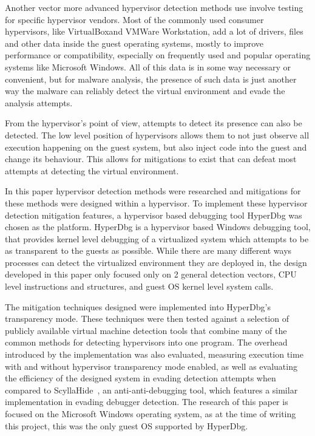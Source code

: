 Another vector more advanced hypervisor detection methods use involve testing for specific hypervisor vendors. Most of the commonly used consumer hypervisors, like VirtualBox\texttrademark and VMWare Workstation\texttrademark, 
add a lot of drivers, files and other data inside the guest operating systems, mostly to improve performance or compatibility, especially on frequently used and popular operating systems like Microsoft Windows. 
All of this data is in some way necessary or convenient, but for malware analysis, the presence of such data is just another way the malware can reliably detect the virtual environment and evade the analysis attempts.

From the hypervisor's point of view, attempts to detect its presence can also be detected. The low level position of hypervisors allows them to not just observe all execution happening on the guest system, 
but also inject code into the guest and change its behaviour. This allows for mitigations to exist that can defeat most attempts at detecting the virtual environment.

In this paper hypervisor detection methods were researched and mitigations for these methods were designed within a hypervisor. To implement these hypervisor detection mitigation features, 
a hypervisor based debugging tool HyperDbg was chosen as the platform. HyperDbg is a hypervisor based Windows debugging tool, that provides kernel level debugging of a virtualized system which attempts to be as transparent to the guests as possible.
While there are many different ways processes can detect the virtualized environment they are deployed in, the design developed in this paper only focused only on 2 general detection vectors, 
CPU level instructions and structures, and guest OS kernel level system calls.

The mitigation techniques designed were implemented into HyperDbg's transparency mode. 
These techniques were then tested against a selection of publicly available virtual machine detection tools that combine many of the common methods for detecting hypervisors into one program. 
The overhead introduced by the implementation was also evaluated, measuring execution time with and without hypervisor transparency mode enabled, as well as evaluating the efficiency of the 
designed system in evading detection attempts when compared to ScyllaHide~\cite{scyllahide}, an anti-anti-debugging tool, which features a similar implementation in evading debugger detection.
The research of this paper is focused on the Microsoft Windows operating system, as at the time of writing this project, this was the only guest OS supported by HyperDbg.

